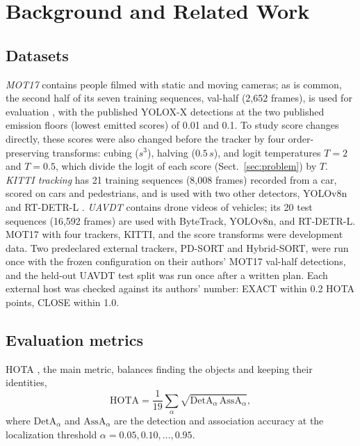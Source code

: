 \documentclass[pdflatex,sn-mathphys-num,iicol]{sn-jnl}
\begin{document}
\section{Background and Related Work}\label{sec:related}

\subsection{Datasets}\label{sec:data}
\emph{MOT17} \cite{milan2016mot16} contains people filmed with static and moving cameras; as is
common, the second half of its seven training sequences, val-half (2,652 frames), is used for
evaluation \cite{zhang2022bytetrack}, with the published YOLOX-X detections \cite{ge2021yolox} at the
two published emission floors (lowest emitted scores) of 0.01 and 0.1. To study score changes
directly, these scores were also changed before the tracker by four order-preserving transforms:
cubing ($s^3$), halving ($0.5\,s$), and logit temperatures $T=2$ and $T=0.5$, which divide the logit
of each score (Sect.~\ref{sec:problem}) by $T$. \emph{KITTI tracking} \cite{geiger2012kitti} has 21
training sequences (8,008 frames) recorded from a car, scored on cars and pedestrians, and is used
with two other detectors, YOLOv8n \cite{jocher2023yolov8} and RT-DETR-L \cite{zhao2024rtdetr}.
\emph{UAVDT} \cite{du2018uavdt} contains drone videos of vehicles; its 20 test sequences (16,592
frames) are used with ByteTrack, YOLOv8n, and RT-DETR-L. MOT17 with four trackers, KITTI, and the
score transforms were development data. Two predeclared external trackers, PD-SORT and Hybrid-SORT,
were run once with the frozen configuration on their authors' MOT17 val-half detections, and the
held-out UAVDT test split was run once after a written plan. Each external host was checked against
its authors' number: EXACT within 0.2 HOTA points, CLOSE within 1.0.

\subsection{Evaluation metrics}\label{sec:metrics}
HOTA \cite{luiten2021hota}, the main metric, balances finding the objects and keeping their
identities,
\begin{equation}
\mathrm{HOTA}=\frac{1}{19}\sum_{\alpha}\sqrt{\mathrm{DetA}_\alpha\,\mathrm{AssA}_\alpha},
\label{eq:hota}
\end{equation}
where $\mathrm{DetA}_\alpha$ and $\mathrm{AssA}_\alpha$ are the detection and association accuracy
at the localization threshold $\alpha=0.05,0.10,\dots,0.95$.
\end{document}
